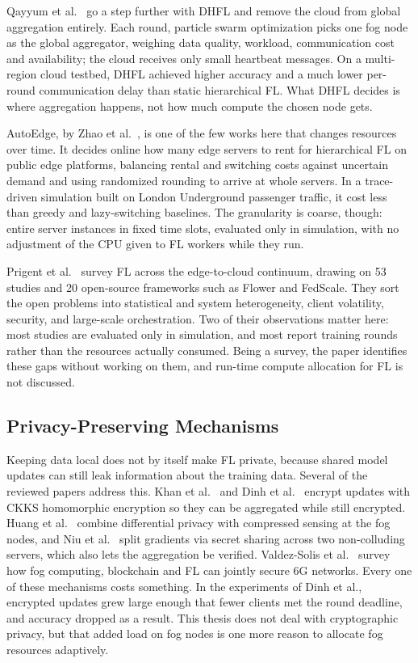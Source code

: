 Qayyum et al.~\cite{qayyum2025dhfl} go a step further with \ac{DHFL} and remove the cloud from global aggregation entirely. Each round, particle swarm optimization picks one fog node as the global aggregator, weighing data quality, workload, communication cost and availability; the cloud receives only small heartbeat messages. On a multi-region cloud testbed, \ac{DHFL} achieved higher accuracy and a much lower per-round communication delay than static hierarchical \ac{FL}. What \ac{DHFL} decides is where aggregation happens, not how much compute the chosen node gets.

AutoEdge, by Zhao et al.~\cite{zhao_autoedge}, is one of the few works here that changes resources over time. It decides online how many edge servers to rent for hierarchical \ac{FL} on public edge platforms, balancing rental and switching costs against uncertain demand and using randomized rounding to arrive at whole servers. In a trace-driven simulation built on London Underground passenger traffic, it cost less than greedy and lazy-switching baselines. The granularity is coarse, though: entire server instances in fixed time slots, evaluated only in simulation, with no adjustment of the \ac{CPU} given to \ac{FL} workers while they run.

Prigent et al.~\cite{prigent2024continuum} survey \ac{FL} across the edge-to-cloud continuum, drawing on 53 studies and 20 open-source frameworks such as Flower and FedScale. They sort the open problems into statistical and system heterogeneity, client volatility, security, and large-scale orchestration. Two of their observations matter here: most studies are evaluated only in simulation, and most report training rounds rather than the resources actually consumed. Being a survey, the paper identifies these gaps without working on them, and run-time compute allocation for \ac{FL} is not discussed.

\subsection{Privacy-Preserving Mechanisms}\label{sec:lit-privacy}

Keeping data local does not by itself make \ac{FL} private, because shared model updates can still leak information about the training data. Several of the reviewed papers address this. Khan et al.~\cite{khan2025wearable} and Dinh et al.~\cite{dinh_ckks} encrypt updates with \ac{CKKS} homomorphic encryption so they can be aggregated while still encrypted. Huang et al.~\cite{huang2025ceppfl} combine differential privacy with compressed sensing at the fog nodes, and Niu et al.~\cite{niu2025verifiable} split gradients via secret sharing across two non-colluding servers, which also lets the aggregation be verified. Valdez-Solis et al.~\cite{valdezsolis2026six_g} survey how fog computing, blockchain and \ac{FL} can jointly secure 6G networks. Every one of these mechanisms costs something. In the experiments of Dinh et al., encrypted updates grew large enough that fewer clients met the round deadline, and accuracy dropped as a result. This thesis does not deal with cryptographic privacy, but that added load on fog nodes is one more reason to allocate fog resources adaptively.

